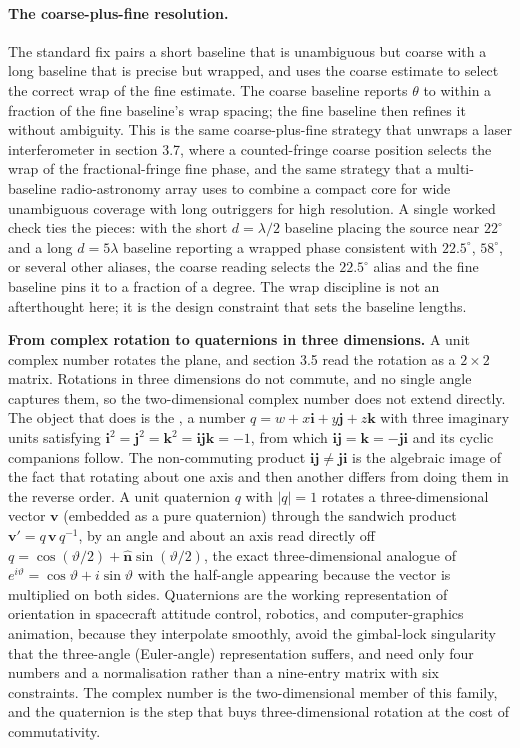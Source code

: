 \paragraph{The coarse-plus-fine resolution.} The standard fix pairs a short
baseline that is unambiguous but coarse with a long baseline that is precise
but wrapped, and uses the coarse estimate to select the correct wrap of the
fine estimate. The coarse baseline reports $\theta$ to within a fraction of
the fine baseline's wrap spacing; the fine baseline then refines it without
ambiguity. This is the same coarse-plus-fine strategy that unwraps a laser
interferometer in section 3.7, where a counted-fringe coarse position selects
the wrap of the fractional-fringe fine phase, and the same strategy that a
multi-baseline radio-astronomy array uses to combine a compact core for wide
unambiguous coverage with long outriggers for high resolution. A single
worked check ties the pieces: with the short $d = \lambda/2$ baseline placing
the source near $22^{\circ}$ and a long $d = 5\lambda$ baseline reporting a
wrapped phase consistent with $22.5^{\circ}$, $58^{\circ}$, or several other
aliases, the coarse reading selects the $22.5^{\circ}$ alias and the fine
baseline pins it to a fraction of a degree. The wrap discipline is not an
afterthought here; it is the design constraint that sets the baseline lengths.

\begin{mastery}
\textbf{From complex rotation to quaternions in three dimensions.} A unit
complex number rotates the plane, and section 3.5 read the rotation as a
$2\times 2$ matrix. Rotations in three dimensions do not commute, and no
single angle captures them, so the two-dimensional complex number does not
extend directly. The object that does is the , a number
$q = w + x\mathbf{i} + y\mathbf{j} + z\mathbf{k}$ with three imaginary units
satisfying $\mathbf{i}^{2} = \mathbf{j}^{2} = \mathbf{k}^{2} = \mathbf{ijk} =
-1$, from which $\mathbf{ij} = \mathbf{k} = -\mathbf{ji}$ and its cyclic
companions follow. The non-commuting product $\mathbf{ij} \ne \mathbf{ji}$ is
the algebraic image of the fact that rotating about one axis and then another
differs from doing them in the reverse order. A unit quaternion $q$ with
$|q| = 1$ rotates a three-dimensional vector $\mathbf{v}$ (embedded as a pure
quaternion) through the sandwich product $\mathbf{v}' = q\,\mathbf{v}\,q^{-1}$,
by an angle and about an axis read directly off $q = \cos(\vartheta/2) +
\hat{\mathbf{n}}\sin(\vartheta/2)$, the exact three-dimensional analogue of
$e^{i\vartheta} = \cos\vartheta + i\sin\vartheta$ with the half-angle
appearing because the vector is multiplied on both sides. Quaternions are the
working representation of orientation in spacecraft attitude control, robotics,
and computer-graphics animation, because they interpolate smoothly, avoid the
gimbal-lock singularity that the three-angle (Euler-angle) representation
suffers, and need only four numbers and a normalisation rather than a
nine-entry matrix with six constraints. The complex number is the
two-dimensional member of this family, and the quaternion is the step that
buys three-dimensional rotation at the cost of commutativity.
\end{mastery}

